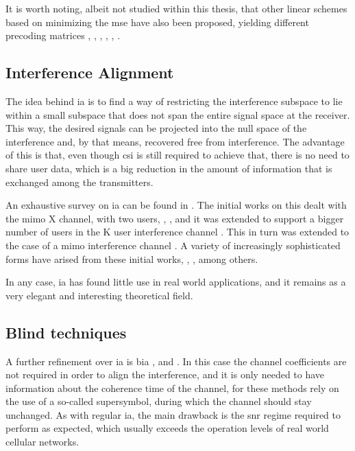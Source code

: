 It is worth noting, albeit not studied within this thesis, that other linear
schemes based on minimizing the \gls{mse} have also been proposed, yielding
different precoding matrices \cite{shi08}, \cite{lu09}, \cite{armada11a}, \cite{shi11}, \cite{bogale12b}, \cite{sohn14}.

\subsection{Interference Alignment} \label{ssec:sa_ia}

The idea behind \gls{ia} is to find a way of restricting the interference
subspace to lie within a small subspace that does not span the entire signal
space at the receiver. This way, the desired signals can be projected into the
null space of the interference and, by that means, recovered free from
interference. The advantage of this is that, even though \gls{csi} is still
required to achieve that, there is no need to share user data, which is a big
reduction in the amount of information that is exchanged among the transmitters.

An exhaustive survey on \gls{ia} can be found in \cite{jafar10ianewlook}. The
initial works on this dealt with the \gls{mimo} X channel, with two users,
\cite{maddah06communication}, \cite{jafar08}, and it was extended to support
a bigger number of users in the K user interference channel \cite{cadambe08}.
This in turn was extended to the case of a \gls{mimo} interference channel
\cite{gou10}. A variety of increasingly sophisticated forms have arised from
these initial works, \cite{jafar14}, \cite{bresler14}, \cite{lashgari14} among
others.

In any case, \gls{ia} has found little use in real world applications, and it
remains as a very elegant and interesting theoretical field.

\subsection{Blind techniques} \label{ssec:sa_blind}

A further refinement over \gls{ia} is \gls{bia} \cite{gou11}, \cite{jafar14b}
and \cite{morales15}. In this case the channel coefficients are not required in
order to align the interference, and it is only needed to have information about
the coherence time of the channel, for these methods rely on the use of a
so-called supersymbol, during which the channel should stay unchanged. As with
regular \gls{ia}, the main drawback is the \gls{snr} regime required to perform
as expected, which usually exceeds the operation levels of real world cellular
networks.

